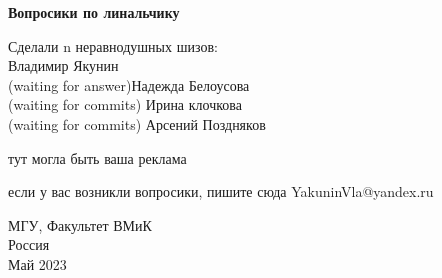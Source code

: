 \begin{titlepage}
    \begin{center}
  
       \vspace*{1cm}
        \huge
       \textbf{Вопросики по линальчику}
        \normalsize

  
            
       \vspace{1.5cm}

       \begin{flushright}
       Сделали n неравнодушных шизов:\\
       Владимир Якунин \\
       (waiting for answer)Надежда Белоусова\\
       (waiting for commits) Ирина клочкова\\
       (waiting for commits) Арсений Поздняков\\
       \end{flushright}

       \vfill
            тут могла быть ваша реклама
       \vfill
     
        если у вас возникли вопросики, пишите сюда YakuninVla@yandex.ru
        
       МГУ, Факультет ВМиК\\
       Россия\\
       Май 2023
    \end{center}
\end{titlepage}
